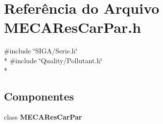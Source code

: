 \section{Referência do Arquivo M\+E\+C\+A\+Res\+Car\+Par.\+h}
\label{_m_e_c_a_res_car_par_8h}
{\ttfamily \#include \char`\"{}S\+I\+G\+A/\+Serie.\+h\char`\"{}}\\*
{\ttfamily \#include \char`\"{}Quality/\+Pollutant.\+h\char`\"{}}\\*
\subsection*{Componentes}
\begin{DoxyCompactItemize}
\item 
class {\bf M\+E\+C\+A\+Res\+Car\+Par}
\end{DoxyCompactItemize}
